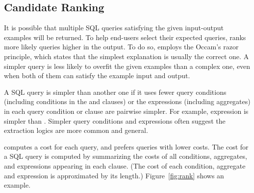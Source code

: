 \subsection{Candidate Ranking}
\label{sec:ranking}


It is possible that multiple SQL queries satisfying
the given input-output examples will be returned.
To help end-users select their expected queries,
\ourtool ranks more likely queries higher in the output.
To do so, \ourtool employs
the Occam's razor principle, which states that the
simplest explanation is usually the correct one.
A simpler query is less likely to overfit the given examples
than a complex one, even when both of them
can satisfy the example input and output.


A SQL query is simpler than another one if it uses
fewer query conditions (including conditions in the 
and  clauses) or the expressions (including
aggregates) in each query condition or clause are pairwise simpler.
For example, expression  is simpler than
.
Simpler query conditions and expressions often suggest the extraction logics
are more common and general.

\ourtool computes a cost for each
query, and prefers queries with lower costs. The cost
for a SQL query is computed by summarizing
the costs of all conditions, aggregates,
and expressions
appearing in each clause. %
(The cost of each condition, aggregate and expression
is approximated by its length.)
Figure~\ref{fig:rank} shows an example.


